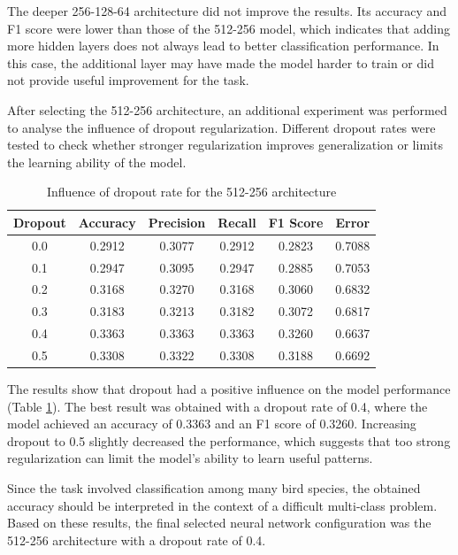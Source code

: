 \documentclass[
onecolumn,
]{ceurart}
\begin{document}
  The deeper 256-128-64 architecture did not improve the results. Its accuracy and F1 score were lower than those of the 512-256 model, which indicates that adding more hidden layers does not always lead to better classification performance. In this case, the additional layer may have made the model harder to train or did not provide useful improvement for the task.


  After selecting the 512-256 architecture, an additional experiment was performed to analyse the influence of dropout regularization. Different dropout rates were tested to check whether stronger regularization improves generalization or limits the learning ability of the model.

  \begin{table}[htbp]
    \centering
    \caption{Influence of dropout rate for the 512-256 architecture}
    \begin{tabular}{|c|c|c|c|c|c|}
      \hline
      Dropout & Accuracy & Precision & Recall & F1 Score & Error \\\hline
      0.0 & 0.2912 & 0.3077 & 0.2912 & 0.2823 & 0.7088 \\\hline
      0.1 & 0.2947 & 0.3095 & 0.2947 & 0.2885 & 0.7053 \\\hline
      0.2 & 0.3168 & 0.3270 & 0.3168 & 0.3060 & 0.6832 \\\hline
      0.3 & 0.3183 & 0.3213 & 0.3182 & 0.3072 & 0.6817 \\\hline
      0.4 & 0.3363 & 0.3363 & 0.3363 & 0.3260 & 0.6637 \\\hline
      0.5 & 0.3308 & 0.3322 & 0.3308 & 0.3188 & 0.6692 \\\hline
    \end{tabular}
    \label{nndropout}
  \end{table}

  The results show that dropout had a positive influence on the model performance (Table \ref{nndropout}). The best result was obtained with a dropout rate of 0.4, where the model achieved an accuracy of 0.3363 and an F1 score of 0.3260. Increasing dropout to 0.5 slightly decreased the performance, which suggests that too strong regularization can limit the model's ability to learn useful patterns.


  Since the task involved classification among many bird species, the obtained accuracy should be interpreted in the context of a difficult multi-class problem. Based on these results, the final selected neural network configuration was the 512-256 architecture with a dropout rate of 0.4.  
  
\end{document}

